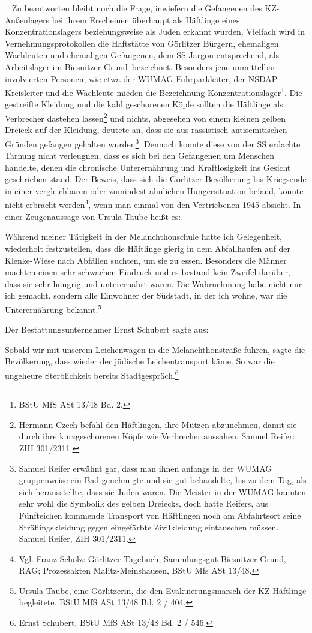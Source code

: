 \documentclass[a4paper,12pt,ngerman,
]{nisebook}
\begin{document}
~\newline
Zu beantworten bleibt noch die Frage, inwiefern die Gefangenen des KZ-Außenlagers bei ihrem Erscheinen überhaupt als Häftlinge eines Konzentrationslagers beziehungsweise als Juden erkannt wurden. Vielfach wird in Vernehmungsprotokollen die Haftstätte von Görlitzer Bürgern, ehemaligen Wachleuten und ehemaligen Gefangenen, dem SS-Jargon entsprechend, als \glqq Arbeitslager im Biesnitzer Grund\grqq~bezeichnet. Besonders jene unmittelbar involvierten Personen, wie etwa der WUMAG Fuhrparkleiter, der NSDAP Kreisleiter und die Wachleute mieden die Bezeichnung Konzentrationslager\footnote{BStU MfS ASt 13/48 Bd. 2.}. Die gestreifte Kleidung und die kahl geschorenen Köpfe sollten die Häftlinge als Verbrecher dastehen lassen\footnote{Hermann Czech befahl den Häftlingen, ihre Mützen abzunehmen, damit sie durch ihre kurzgeschorenen Köpfe wie Verbrecher aussahen. Samuel Reifer: ZIH 301/2311.} und nichts, abgesehen von einem kleinen gelben Dreieck auf der Kleidung, deutete an, dass sie aus rassistisch-antisemitischen Gründen gefangen gehalten wurden\footnote{Samuel Reifer erwähnt gar, dass man ihnen anfangs in der WUMAG gruppenweise ein Bad genehmigte und sie gut behandelte, bis zu dem Tag, als sich herausstellte, dass sie Juden waren. Die Meister in der WUMAG kannten sehr wohl die Symbolik des gelben Dreiecks, doch hatte Reifers, aus Fünfteichen kommende Transport von Häftlingen noch am Abfahrtsort seine Sträflingskleidung gegen eingefärbte Zivilkleidung eintauschen müssen. Samuel Reifer, ZIH 301/2311.}. Dennoch konnte diese von der SS erdachte Tarnung nicht verleugnen, dass es sich bei den Gefangenen um Menschen handelte, denen die chronische Unterernährung und Kraftlosigkeit ins Gesicht geschrieben stand. Der Beweis, dass sich die Görlitzer Bevölkerung bis Kriegsende in einer vergleichbaren oder zumindest ähnlichen Hungersituation befand, konnte nicht erbracht werden\footnote{Vgl. Franz Scholz: \glqq Görlitzer Tagebuch\grqq; Sammlungsgut Biesnitzer Grund, RAG; Prozessakten Malitz-Meinshausen, BStU Mfs ASt 13/48.}, wenn man einmal von den Vertriebenen 1945 absieht. In einer Zeugenaussage von Ursula Taube heißt es:
\begin{leftbar}
Während meiner Tätigkeit in der Melanchthonschule hatte ich Gelegenheit, wiederholt festzustellen, dass die Häftlinge gierig in dem Abfallhaufen auf der Klenke-Wiese nach Abfällen suchten, um sie zu essen. Besonders die Männer machten einen sehr schwachen Eindruck und es bestand kein Zweifel darüber, dass sie sehr hungrig und unterernährt waren. Die Wahrnehmung habe nicht nur ich gemacht, sondern alle Einwohner der Südstadt, in der ich wohne, war die Unterernährung bekannt.\footnote{Ursula Taube, eine Görlitzerin, die den Evakuierungsmarsch der KZ-Häftlinge begleitete. BStU MfS ASt 13/48 Bd. 2 / 404.}\end{leftbar}
Der Bestattungsunternehmer Ernst Schubert sagte aus:
\begin{leftbar}
Sobald wir mit unserem Leichenwagen in die Melanchthonstraße fuhren, sagte die Bevölkerung, dass wieder der jüdische Leichentransport käme. So war die ungeheure Sterblichkeit bereits Stadtgespräch.\footnote{Ernst Schubert, BStU MfS ASt 13/48 Bd. 2 / 546.}
\end{leftbar}
\end{document}
